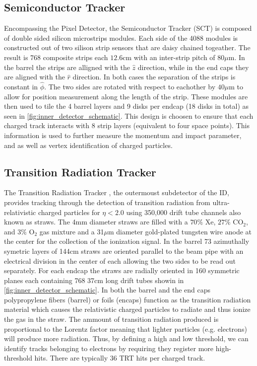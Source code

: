 \subsection{Semiconductor Tracker}

Encompassing the Pixel Detector, the Semiconductor Tracker (SCT) \cite{PERF-2007-01} is composed of
double sided silicon microstrips modules.  Each side of the 4088 modules is
constructed out of two silison strip sensors that are daisy chained togeather.
The result is 768 composite strips each $12.6$cm with an inter-strip pitch of
$80 \mu$m. In the barrel the strips are alligned with the $\hat{z}$ direction,
while in the end caps they are aligned with the $\hat{r}$ direction. In both
cases the separation of the strips is constant in $\hat{\phi}$. The two sides
are rotated with respect to eachother by $40 \mu$m to allow for position
measurement along the length of the strip.  These modules are then used to tile
the 4 barrel layers and 9 disks per endcap (18 disks in total) as seen in
\cref{fig:inner_detector_schematic}.  This design is choosen to ensure that each
charged track interacts with 8 strip layers (equivalent to four space points).
This information is used to further measure the momentum and impact parameter,
and as well as vertex identification of charged particles.

\subsection{Transition Radiation Tracker}

The Transition Radiation Tracker \cite{PERF-2007-01}, the outermoust subdetector
of the ID, provides tracking through the detection of transition radiation from
ultra-relativistic charged particles for $\eta < 2.0$ using 350,000 drift tube
channels also known as straws.  The 4mm diameter straws are filled with a $70\%$
Xe, $27\%$ CO$_2$, and $3\%$ O$_2$ gas mixture and a 31$\mu$m diameter
gold-plated tungsten wire anode at the center for the collection of the
ionization signal. In the barrel 73 azimuthally symetric layers of 144cm straws
are oriented parallel to the beam pipe with an electrical division in the center
of each allowing the two sides to be read out separately.  For each endcap the
straws are radially oriented in 160 symmetric planes each containing 768 37cm
long drift tubes showin in \cref{fig:inner_detector_schematic}.  In both
the barrel and the end caps polypropylene fibers (barrel) or foils (encaps)
function as the transition radiation material which causes the relativistic
charged particles to radiate and thus ionize the gas in the straw.  The ammount
of transition radiation produced is proportional to the Lorentz factor meaning
that lighter particles (e.g. electrons) will produce more radiation.  Thus, by
defining a high and low threshold, we can identify tracks belonging to electrons
by requiring they register more high-threshold hits. There are typically 36 TRT
hits per charged track. 
